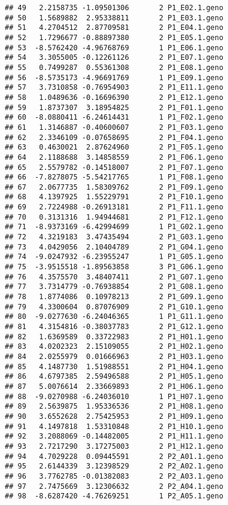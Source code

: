 \documentclass[]{article}
\begin{document}
\begin{verbatim}
## 49   2.2158735 -1.09501306       2 P1_E02.1.geno
## 50   1.5689882  2.95338811       2 P1_E03.1.geno
## 51   4.2704512  2.87709581       2 P1_E04.1.geno
## 52   1.7296677 -0.88897380       2 P1_E05.1.geno
## 53  -8.5762420 -4.96768769       1 P1_E06.1.geno
## 54   3.3055005 -0.12261126       2 P1_E07.1.geno
## 55   0.7499287  0.55361308       2 P1_E08.1.geno
## 56  -8.5735173 -4.96691769       1 P1_E09.1.geno
## 57   3.7310858 -0.76954903       2 P1_E11.1.geno
## 58   1.0489636 -0.16696390       2 P1_E12.1.geno
## 59   1.8737307  3.18954825       2 P1_F01.1.geno
## 60  -8.0880411 -6.24614431       1 P1_F02.1.geno
## 61   1.3146887 -0.40600607       2 P1_F03.1.geno
## 62   2.3346109 -0.07658695       2 P1_F04.1.geno
## 63   0.4630021  2.87624960       2 P1_F05.1.geno
## 64   2.1188688  3.14858559       2 P1_F06.1.geno
## 65   2.5579782 -0.14518007       2 P1_F07.1.geno
## 66  -7.8278075 -5.54217765       1 P1_F08.1.geno
## 67   2.0677735  1.58309762       2 P1_F09.1.geno
## 68   4.1397925  1.55229791       2 P1_F10.1.geno
## 69   2.7224988 -0.26913181       2 P1_F11.1.geno
## 70   0.3131316  1.94944681       2 P1_F12.1.geno
## 71  -8.9373169 -6.42994699       1 P1_G02.1.geno
## 72   4.3219183  3.47435494       2 P1_G03.1.geno
## 73   4.0429056  2.10404789       2 P1_G04.1.geno
## 74  -9.0247932 -6.23955247       1 P1_G05.1.geno
## 75  -3.9515518 -1.89563858       3 P1_G06.1.geno
## 76   4.3575570  3.48407411       2 P1_G07.1.geno
## 77   3.7314779 -0.76938854       2 P1_G08.1.geno
## 78   1.8774086  0.10978213       2 P1_G09.1.geno
## 79   4.3300604  0.87076909       2 P1_G10.1.geno
## 80  -9.0277630 -6.24046365       1 P1_G11.1.geno
## 81   4.3154816 -0.38037783       2 P1_G12.1.geno
## 82   1.6369589  0.33722983       2 P1_H01.1.geno
## 83   4.0202323  2.15109055       2 P1_H02.1.geno
## 84   2.0255979  0.01666963       2 P1_H03.1.geno
## 85   4.1487730  1.51988551       2 P1_H04.1.geno
## 86   4.6797385  2.59496588       2 P1_H05.1.geno
## 87   5.0076614  2.33669893       2 P1_H06.1.geno
## 88  -9.0270988 -6.24036010       1 P1_H07.1.geno
## 89   2.5639875  1.95336536       2 P1_H08.1.geno
## 90   3.6552628  2.75425953       2 P1_H09.1.geno
## 91   4.1497818  1.53310848       2 P1_H10.1.geno
## 92   3.2088069 -0.14482005       2 P1_H11.1.geno
## 93   2.7217290  3.17275003       2 P1_H12.1.geno
## 94   4.7029228  0.09445591       2 P2_A01.1.geno
## 95   2.6144339  3.12398529       2 P2_A02.1.geno
## 96   3.7762785 -0.01382083       2 P2_A03.1.geno
## 97   2.7475669  3.12306632       2 P2_A04.1.geno
## 98  -8.6287420 -4.76269251       1 P2_A05.1.geno

\end{verbatim}
\end{document}
